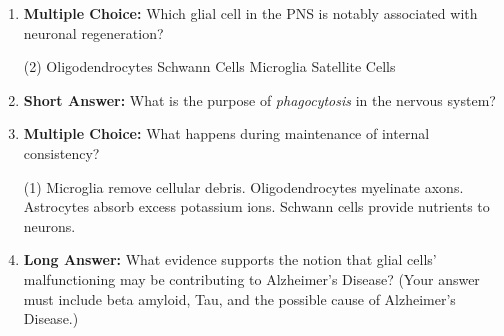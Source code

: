 \begin{enumerate}[label=\textbf{Q2.1.\arabic*}]
      \item \textbf{Multiple Choice:} Which glial cell in the PNS is notably associated with neuronal regeneration?
            \begin{tasks}[label=(\Alph*), label-width=1.5em, item-indent=1.7em](2)
                  \task Oligodendrocytes
                  \task Schwann Cells
                  \task Microglia
                  \task Satellite Cells
            \end{tasks}

      \item \textbf{Short Answer:} What is the purpose of \textit{phagocytosis} in the nervous system? \\

      \item \textbf{Multiple Choice:} What happens during maintenance of internal consistency?
            \begin{tasks}[label=(\Alph*), label-width=1.5em, item-indent=1.7em](1)
                  \task Microglia remove cellular debris.
                  \task Oligodendrocytes myelinate axons.
                  \task Astrocytes absorb excess potassium ions.
                  \task Schwann cells provide nutrients to neurons.
            \end{tasks}
      \item \textbf{Long Answer:} What evidence supports the notion that glial cells' malfunctioning may be contributing to Alzheimer's Disease? (Your answer must include beta amyloid, Tau, and the possible cause of Alzheimer's Disease.) \\

\end{enumerate}
\newpage
\squigglyline

